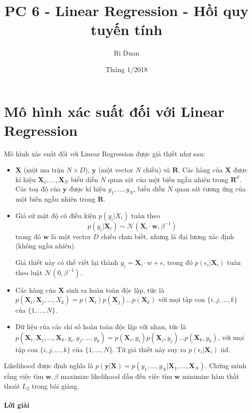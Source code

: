 \documentclass{article}
\title{PC 6 - Linear Regression - Hồi quy tuyến tính}
\author{Ri Duan}
\date{Tháng 1/2018}
\let\mb\mathbf
\begin{document}
\maketitle

\section{Mô hình xác suất đối với Linear Regression}
Mô hình xác suất đối với Linear Regression được giả thiết như sau:
\begin{itemize}
	\item $\mb X$ (một ma trận $N\times D$), $\mb y$ (một vector $N$ chiều)  và $\mb R$. Các hàng của $\mb X$ được kí hiệu $\mb X_1, \ldots, \mb X_N$ biểu diễn $N$ quan sát của một biến ngẫu nhiên trong $\mb R^d$. Các toạ độ của $\mb y$ được kí hiệu $y_1, \ldots, y_N$, biểu diễn $N$ quan sát tương ứng của một biến ngẫu nhiên trong $\mb R$.
	\item Giả sử mật độ có điều kiện $p(y_i| X_i)$ tuân theo 
		$$
			p(y_i|\mb X_i) \sim \mathcal N (\mb X_i \cdot \mb w, \beta^{-1})
		$$
		trong đó $\mb w$ là một vector $D$ chiều chưa biết, nhưng là đại lượng xác định (không ngẫu nhiên).
		
		Giả thiết này có thể viết lại thành $y_i = \mb X_i \cdot w + \epsilon$, trong đó $p(\epsilon_i| \mb X_i)$ tuân theo luật $\mathcal N (0, \beta^{-1})$.
	
	\item Các hàng của $\mb X$ sinh ra hoàn toàn độc lập, tức là $p(\mb X_i, \mb X_j, \ldots, X_k) = p(\mb X_i)p(\mb X_j)\ldots p(\mb X_k)$ với mọi tập con $\{i, j , \ldots, k\}$ của $\{1, \ldots, N\}$.
	\item Dữ liệu của các chỉ số hoàn toàn độc lập với nhau, tức là $p(\mb X_i, \mb X_j, \ldots, \mb X_k, y_i, y_j, \ldots, y_k) = p(\mb X_i, y_i)p(\mb X_j, y_j)\ldots p(\mb  X_k, y_k)$, với mọi tập con $\{i, j , \ldots, k\}$ của $\{1, \ldots, N\}$. Từ giả thiết này suy ra $p(\epsilon_i| \mb X_i)$ iid.
\end{itemize}

Likelihood được định nghĩa là $p(\mathbf y|\mathbf X) = p(y_1, \ldots, y_N | \mb X_1, \ldots, \mb X_N)$. Chứng minh rằng việc tìm $\mb w, \beta$ maximize likelihood dẫn đến việc tìm $\mb w$ minimize hàm thất thoát $L_2$ trong bài giảng.

\paragraph{Lời giải}
\end{document}

